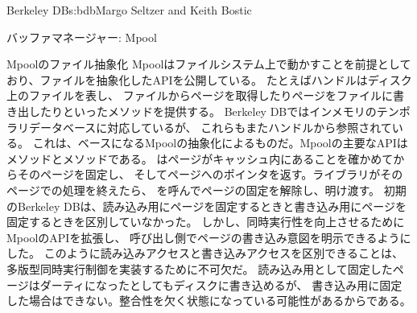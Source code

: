 \begin{aosachapter}{Berkeley DB}{s:bdb}{Margo Seltzer and Keith Bostic}
\begin{aosasect1}{バッファマネージャー: Mpool}
\begin{aosasect2}{Mpoolのファイル抽象化}
Mpoolはファイルシステム上で動かすことを前提としており、ファイルを抽象化したAPIを公開している。
たとえばハンドルはディスク上のファイルを表し、
ファイルからページを取得したりページをファイルに書き出したりといったメソッドを提供する。
Berkeley DBではインメモリのテンポラリデータベースに対応しているが、
これらもまたハンドルから参照されている。
これは、ベースになるMpoolの抽象化によるものだ。Mpoolの主要なAPIは
メソッドとメソッドである。
はページがキャッシュ内にあることを確かめてからそのページを固定し、
そしてページへのポインタを返す。ライブラリがそのページでの処理を終えたら、
を呼んでページの固定を解除し、明け渡す。
初期のBerkeley DBは、読み込み用にページを固定するときと書き込み用にページを固定するときを区別していなかった。
しかし、同時実行性を向上させるためにMpoolのAPIを拡張し、
呼び出し側でページの書き込み意図を明示できるようにした。
このように読み込みアクセスと書き込みアクセスを区別できることは、
多版型同時実行制御を実装するために不可欠だ。
読み込み用として固定したページはダーティになったとしてもディスクに書き込めるが、
書き込み用に固定した場合はできない。整合性を欠く状態になっている可能性があるからである。

\end{aosasect2}


\end{aosasect1}
\end{aosachapter}
